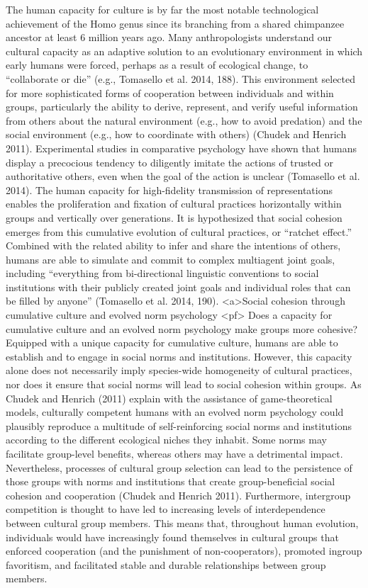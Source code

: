 The human capacity for culture is by far the most notable technological achievement of the Homo genus since its branching from a shared chimpanzee ancestor at least 6 million years ago. Many anthropologists understand our cultural capacity as an adaptive solution to an evolutionary environment in which early humans were forced, perhaps as a result of ecological change, to “collaborate or die” (e.g., Tomasello et al. 2014, 188). This environment selected for more sophisticated forms of cooperation between individuals and within groups, particularly the ability to derive, represent, and verify useful information from others about the natural environment (e.g., how to avoid predation) and the social environment (e.g., how to coordinate with others) (Chudek and Henrich 2011).
Experimental studies in comparative psychology have shown that humans display a precocious tendency to diligently imitate the actions of trusted or authoritative others, even when the goal of the action is unclear (Tomasello et al. 2014). The human capacity for high-fidelity transmission of representations enables the proliferation and fixation of cultural practices horizontally within groups and vertically over generations. It is hypothesized that social cohesion emerges from this cumulative evolution of cultural practices, or “ratchet effect.” Combined with the related ability to infer and share the intentions of others, humans are able to simulate and commit to complex multiagent joint goals, including “everything from bi-directional linguistic conventions to social institutions with their publicly created joint goals and individual roles that can be filled by anyone” (Tomasello et al. 2014, 190).
<a>Social cohesion through cumulative culture and evolved norm psychology
<pf> Does a capacity for cumulative culture and an evolved norm psychology make groups more cohesive? Equipped with a unique capacity for cumulative culture, humans are able to establish and to engage in social norms and institutions. However, this capacity alone does not necessarily imply species-wide homogeneity of cultural practices, nor does it ensure that social norms will lead to social cohesion within groups. As Chudek and Henrich (2011) explain with the assistance of game-theoretical models, culturally competent humans with an evolved norm psychology could plausibly reproduce a multitude of self-reinforcing social norms and institutions according to the different ecological niches they inhabit. Some norms may facilitate group-level benefits, whereas others may have a detrimental impact. Nevertheless, processes of cultural group selection can lead to the persistence of those groups with norms and institutions that create group-beneficial social cohesion and cooperation (Chudek and Henrich 2011). Furthermore, intergroup competition is thought to have led to increasing levels of interdependence between cultural group members. This means that, throughout human evolution, individuals would have increasingly found themselves in cultural groups that enforced cooperation (and the punishment of non-cooperators), promoted ingroup favoritism, and facilitated stable and durable relationships between group members.
